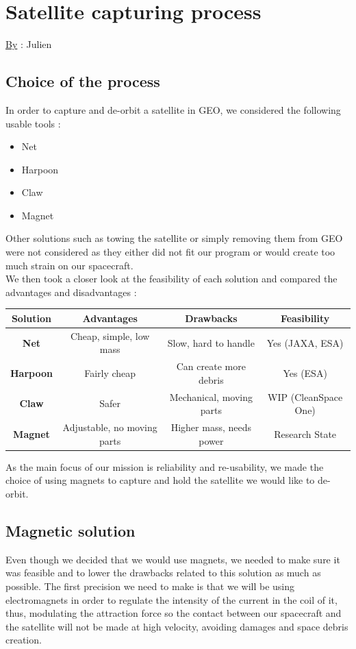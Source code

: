 \chapter{Satellite capturing process}
\qquad \underline{By} : Julien \\
\label{sec:5}
\section{Choice of the process}

\qquad In order to capture and de-orbit a satellite in GEO, we considered the following usable tools :
\begin{itemize}
	\item Net
	\item Harpoon
	\item Claw
	\item Magnet
\end{itemize}

Other solutions such as towing the satellite or simply removing them from GEO were not considered as they either did not fit our program or would create too much strain on our spacecraft.\\

We then took a closer look at the feasibility of each solution and compared the advantages and disadvantages :
\begin{center}
	\begin{tabular}[H]{|c|c|c|c|}
		\hline
		\textbf{Solution} & \textbf{Advantages} & \textbf{Drawbacks} & \textbf{Feasibility}\\
		\hline
		\textbf{Net} & Cheap, simple, low mass &Slow, hard to handle & Yes (JAXA, ESA)\\
		\hline
		\textbf{Harpoon} & Fairly cheap & Can create more debris& Yes (ESA)\\
		\hline
		\textbf{Claw} & Safer & Mechanical, moving parts& WIP (CleanSpace One)\\
		\hline
		\textbf{Magnet} &Adjustable, no moving parts & Higher mass, needs power& Research State\\
		\hline
	\end{tabular}
\end{center}

As the main focus of our mission is reliability and re-usability, we made the choice of using magnets to capture and hold the satellite we would like to de-orbit.

\section{Magnetic solution}
\qquad Even though we decided that we would use magnets, we needed to make sure it was feasible and to lower the drawbacks related to this solution as much as possible. The first precision we need to make is that we will be using electromagnets in order to regulate the intensity of the current in the coil of it, thus, modulating the attraction force so the contact between our spacecraft and the satellite will not be made at high velocity, avoiding damages and space debris creation. \\


